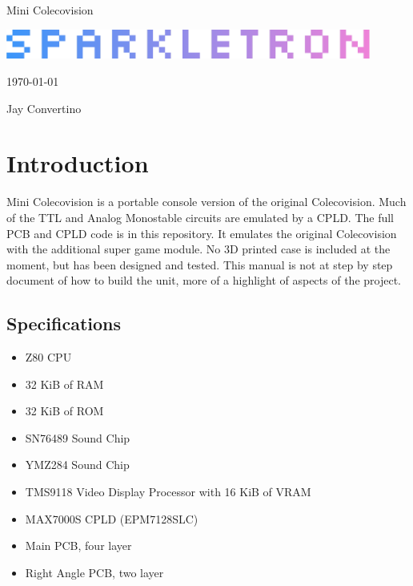 \begin{titlepage}
  \begin{center}

  {\Huge Mini Colecovision}

  \vspace{25mm}

  \includegraphics[width=0.90\textwidth,height=\textheight,keepaspectratio]{img/SPARKLETRON.png}

  \vspace{25mm}

  \today

  \vspace{15mm}

  {\Large Jay Convertino}

  \end{center}
\end{titlepage}

\tableofcontents

\newpage

\section{Introduction}

\par
Mini Colecovision is a portable console version of the original Colecovision. Much of the TTL and Analog Monostable circuits
are emulated by a CPLD. The full PCB and CPLD code is in this repository. It emulates the original Colecovision
with the additional super game module. No 3D printed case is included at the moment, but has been designed and tested. This
manual is not at step by step document of how to build the unit, more of a highlight of aspects of the project.

\subsection{Specifications}

\par
\begin{itemize}
  \item Z80 CPU
  \item 32 KiB of RAM
  \item 32 KiB of ROM
  \item SN76489 Sound Chip
  \item YMZ284 Sound Chip
  \item TMS9118 Video Display Processor with 16 KiB of VRAM
  \item MAX7000S CPLD (EPM7128SLC)
  \item Main PCB, four layer
  \item Right Angle PCB, two layer
\end{itemize}

